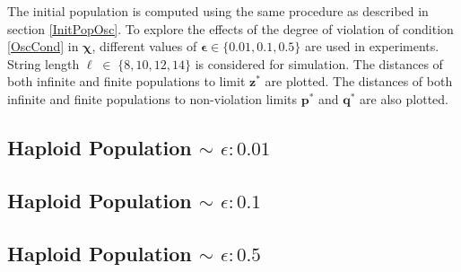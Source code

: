 % 
% 
The initial population is 
computed using the same procedure as described in section \ref{InitPopOsc}. To explore the effects of the degree  
of violation of condition \ref{OscCond} in $\bm{\chi}$, different values of $\bm{\epsilon} \in \{0.01, 0.1, 0.5\} $ are used in experiments. 
String length $\ell \;\in\; \{8, 10, 12, 14\}$ is considered for simulation.
The distances of both infinite and finite populations to limit $\bm{z}^\ast$ are plotted. 
The distances of both infinite and finite populations to non-violation limits $\bm{p}^\ast$ and $\bm{q}^\ast$ are also plotted.

\clearpage
\subsection{Haploid Population $\mathtt{\sim}$ $\epsilon: 0.01$}

\subsection{Haploid Population $\mathtt{\sim}$ $\epsilon: 0.1$}

\subsection{Haploid Population $\mathtt{\sim}$ $\epsilon: 0.5$}

\clearpage
